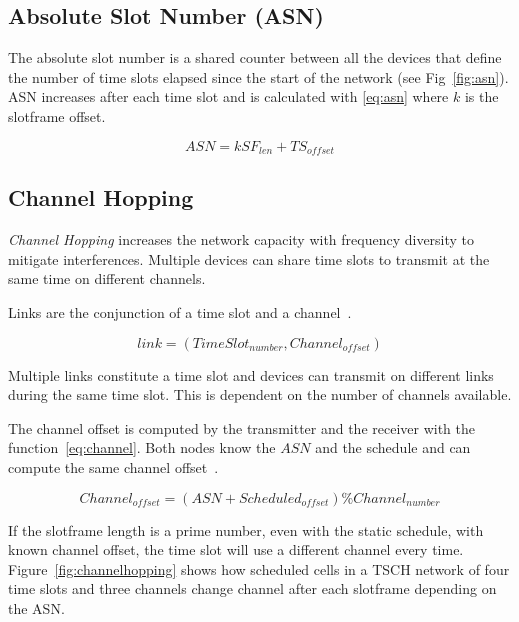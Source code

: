 

\subsection{Absolute Slot Number (ASN)}

The absolute slot number is a shared counter between all the devices that
define the number of time slots elapsed since the start of the
network (see Fig~\ref{fig:asn}).
ASN increases after each time slot and is calculated with \ref{eq:asn} where $k$
is the slotframe offset.

\begin{equation}
  \label{eq:asn}
  ASN = k SF_{len} + TS_{offset}
\end{equation}



\subsection{Channel Hopping}

\emph{Channel Hopping} increases the network capacity with frequency diversity
to mitigate interferences.
Multiple devices can share time slots to transmit at the same time on different
channels.

Links are the conjunction of a time slot and a channel~\cite{Chen2013PerformanceAO}.

\begin{equation}
  \label{eq:links}
  link = (TimeSlot_{number}, Channel_{offset})
\end{equation}

Multiple links constitute a time slot and devices can transmit on different
links during the same time slot.
This is dependent on the number of channels available.

The channel offset is computed by the transmitter and the receiver with the
function~\ref{eq:channel}. Both nodes know the $ASN$ and the schedule and can
compute the same channel offset~\cite{rfc7554}.

\begin{equation}
  \label{eq:channel}
  Channel_{offset} = (ASN + Scheduled_{offset}) \% Channel_{number}
\end{equation}

If the slotframe length is a prime number, even with the static schedule,
with known channel offset, the time slot will use a different channel every time.
Figure~\ref{fig:channelhopping} shows how scheduled cells in a TSCH network of
four time slots and three channels change channel after each slotframe depending
on the ASN.


